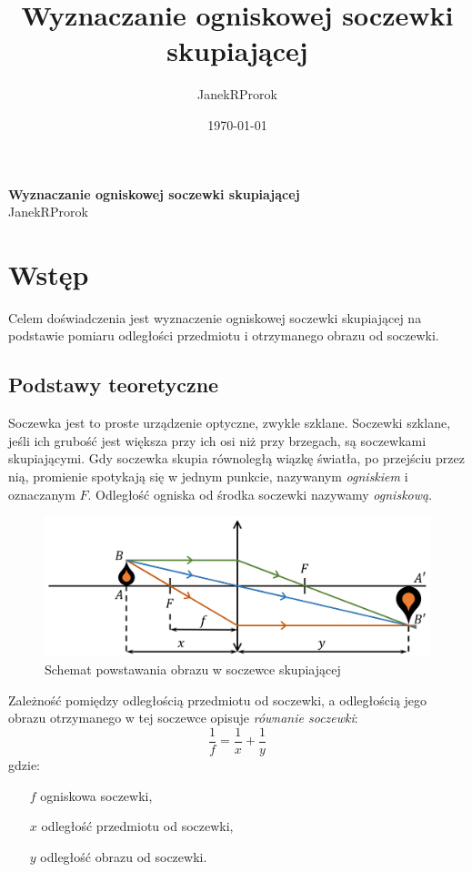 \documentclass[11pt,oneside,final,notitlepage,a4paper,wide]{mwart}
\title{Wyznaczanie ogniskowej soczewki skupiającej}
\author{JanekR\underline{\hspace{0.2cm}}Prorok}
\date{\today}
\begin{document}

	\begin{center}
	 	\LARGE{\textbf{Wyznaczanie ogniskowej soczewki skupiającej}}\\ \medskip
 		\small{JanekR\underline{\hspace{0.2cm}}Prorok}
	\end{center}
\section{Wstęp}
	Celem doświadczenia jest wyznaczenie ogniskowej soczewki skupiającej na podstawie pomiaru odległości przedmiotu i otrzymanego obrazu od soczewki.
%
	\subsection{Podstawy teoretyczne}
		Soczewka jest to proste urządzenie optyczne, zwykle szklane. Soczewki szklane, jeśli ich grubość jest większa przy ich osi niż przy brzegach, są soczewkami skupiającymi. Gdy soczewka skupia równoległą wiązkę światła, po przejściu przez nią, promienie spotykają się w jednym punkcie, nazywanym \emph{ogniskiem} i oznaczanym $F$. Odległość ogniska od środka soczewki nazywamy \emph{ogniskową}.
		\begin{figure}[h]
			\centering
			\includegraphics[width=\textwidth]{rys/schemat_powstawania_obrazu.png}
			\caption{Schemat powstawania obrazu w soczewce skupiającej}
		\end{figure}
	
		Zależność pomiędzy odległością przedmiotu od soczewki, a odległością jego obrazu otrzymanego w tej soczewce opisuje \emph{równanie soczewki}:
		\begin{equation}
			\frac{1}{f} = \frac{1}{x} + \frac{1}{y}
		\end{equation}
		gdzie:
		\begin{itemize}		
			\item[$f$] ogniskowa soczewki,
			\item[$x$] odległość przedmiotu od soczewki,
			\item[$y$] odległość obrazu od soczewki.
		\end{itemize} \smallskip
	
\end{document}
